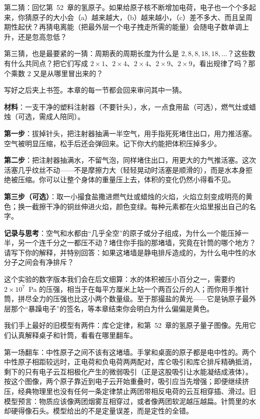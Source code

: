 第二猜：回忆第~52~章的氢原子。如果给原子核不断增加电荷，电子也一个个多起来，你猜原子的大小会（a）越来越大，（b）越来越小，（c）差不多大、而且呈周期性起伏？再猜电离能（把最外层一个电子拽走所需的能量）会随电子数单调上升，还是忽高忽低？

第三猜，也是最要紧的一猜：周期表的周期长度为什么是 \(2,8,8,18,18,\dots\)？这些数有什么共同点？把它们写成 \(2\times1\)、\(2\times4\)、\(2\times4\)、\(2\times9\)、\(2\times9\)，看出规律了吗？那个乘数 \(2\) 又是从哪里冒出来的？

写好之后夹上书签。本章的每一节都会回来审问其中一猜。


\begin{experiment}[针筒里的两堵墙]
\textbf{材料}：一支干净的塑料注射器（不要针头），水，一点食用盐（可选），燃气灶或蜡烛（可选，需成人陪同）。

\textbf{第一步}：拔掉针头，把注射器抽满一半空气，用手指死死堵住出口，用力推活塞。空气被明显压缩，松手后还会弹回来。记下你大约能把体积压掉多少。

\textbf{第二步}：把注射器抽满水，不留气泡，同样堵住出口，用更大的力气推活塞。这次活塞几乎纹丝不动——不是摩擦力大（轻轻晃动时活塞是顺滑的），而是水本身拒绝被压缩。你可以让整个身体的重量压上去，体积的变化仍然小得看不见。

\textbf{第三步（可选）}：取一小撮食盐撒进燃气灶或蜡烛的火焰，火焰立刻变成明亮的黄色；换一截擦干净的铜丝伸进火焰，颜色变绿。每种元素都在火焰里报出自己的名字。

\textbf{记录与思考}：空气和水都由“几乎全空”的原子或分子组成，为什么一个能压掉一半，另一个连千分之一都压不动？堵住你手指的那堵墙，究竟在针筒的哪个地方？请写下你的解释，并特别回答：如果这堵墙是静电排斥造成的，为什么电中性的水分子之间会有净排斥？
\end{experiment}

这个实验的数字版本我们会在后文细算：水的体积被压小百分之一，需要约 \(2\times10^{7}\)~Pa 的压强，相当于在每平方厘米上站一个两百公斤的人；而你用手推针筒，拼尽全力的压强也比这小两个数量级。至于那撮盐的黄光——它是钠原子最外层那个“暴躁电子”的签名，等本章结束你会明白为什么偏偏是黄色。


我们手上最好的旧模型有两件：库仑定律，和第~52~章的氢原子量子图像。先用它们认真解释桌子和针筒，看看在哪里翻车。

第一场翻车：中性原子之间不该有这堵墙。手掌和桌面的原子都是电中性的。两个中性原子相距较远时，正电荷和负电荷两两配对，库仑吸引和库仑排斥精确抵消，剩下的只有电子云互相极化产生的微弱吸引（正是这股吸引让水能凝结成液体）。按这个图像，两个原子靠近到电子云开始重叠时，吸引应当先增强；即便继续挤压，经典物理里也没有任何一条定律禁止两团带相反电荷的云互相穿插、滑过。旧模型预言：物质应该像两团烟雾互相穿过，或者像两团软泥越压越扁。针筒里的水却硬得像石头。模型给出的不是定量误差，而是定性的全错。

